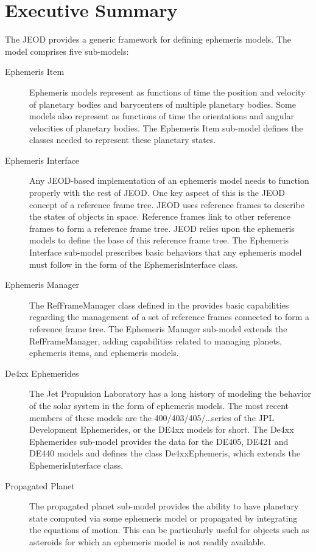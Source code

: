%
%
% 


\chapter*{Executive Summary}

The JEOD \ModelDesc provides a generic framework for defining ephemeris models.
The model comprises five sub-models:
\begin{description}
\item[Ephemeris Item]
Ephemeris models represent as functions of time the position and velocity of
planetary bodies and barycenters of multiple planetary bodies.
Some models also represent as functions of time the orientations and angular
velocities of planetary bodies.
The Ephemeris Item sub-model defines the classes needed to represent these
planetary states.
\item[Ephemeris Interface]
Any JEOD-based implementation of an ephemeris model needs to function
properly with the rest of JEOD. One key aspect of this is the JEOD concept of a
reference frame tree.  JEOD uses reference frames to describe the states of
objects in space. Reference frames link to other reference frames to form a
reference frame tree. JEOD relies upon the ephemeris models to
define the base of this reference frame tree.
The Ephemeris Interface sub-model prescribes basic behaviors that any
ephemeris model must follow in the form of the EphemerisInterface class.
\item[Ephemeris Manager]
The RefFrameManager class defined in the {\REFFRAMES} provides basic
capabilities regarding the management of a set of reference frames connected
to form a reference frame tree. The Ephemeris Manager sub-model extends the
RefFrameManager, adding capabilities related to managing planets,
ephemeris items, and ephemeris models.
\item[De4xx Ephemerides]
The Jet Propulsion Laboratory has a long history of modeling the behavior of the
solar system in the form of ephemeris models. The most recent members of these
models are the 400/403/405/\ldots series of the JPL Development Ephemerides, or
the DE4xx models for short. The De4xx Ephemerides sub-model provides the data for
the DE405, DE421 and DE440 models and defines the class
De4xxEphemeris, which extends the EphemerisInterface class.
\item[Propagated Planet]
The propagated planet sub-model
provides the ability to have planetary state
computed via some ephemeris model
or propagated by integrating the equations of motion.
This can be particularly useful for objects such as asteroids
for which an ephemeris model is not readily
available.
\end{description}
